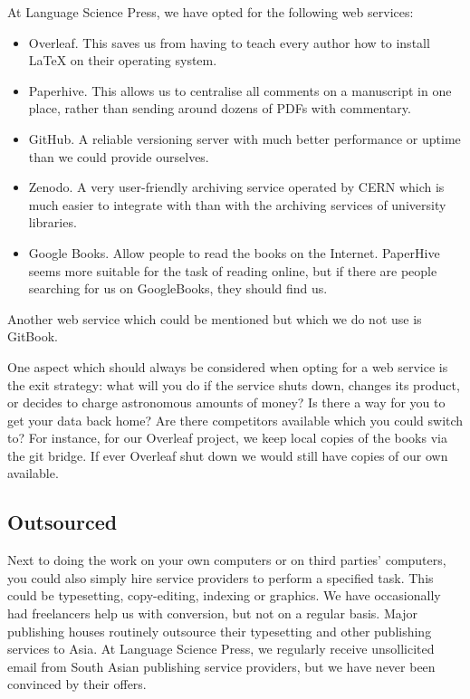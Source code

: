 \documentclass[nonflat,modfonts,output=book] {langsci/langscibook}
\begin{document}
At Language Science Press, we have opted for the following web services: 

\begin{itemize}
 \item Overleaf. This saves us from having to teach every author how to install \LaTeX\xspace on their operating system. 
 \item Paperhive. This allows us to centralise all comments on a manuscript in one place, rather than sending around dozens of PDFs with commentary. 
 \item GitHub. A reliable versioning server with much better performance or uptime than we could provide ourselves. 
 \item Zenodo. A very user-friendly archiving service operated by CERN which is much easier to integrate with than with the archiving services of university libraries.
 \item Google Books. Allow people to read the books on the Internet. PaperHive seems more suitable for the task of reading online, but if there are people searching for us on GoogleBooks, they should find us. 
\end{itemize}

Another web service which could be mentioned but which we do not use is GitBook. 

One aspect which should always be considered when opting for a web service is the exit strategy: what will you do if the service shuts down, changes its product, or decides to charge astronomous amounts of money? Is there a way for you to get your data back home? Are there competitors available which you could switch to? For instance, for our Overleaf project, we keep local copies of the books via the git bridge. If ever Overleaf shut down we would still have copies of our own available. 

\subsection{Outsourced}
Next to doing the work on your own computers or on third parties' computers, you could also simply hire service providers to perform a specified task. This could be typesetting, copy-editing, indexing or graphics. We have occasionally had freelancers help us with conversion, but not on a regular basis. Major publishing houses routinely outsource their typesetting and other publishing services to Asia. At Language Science Press, we regularly receive unsollicited email from South Asian publishing service providers, but we have never been convinced by their offers. 
            
\end{document}
